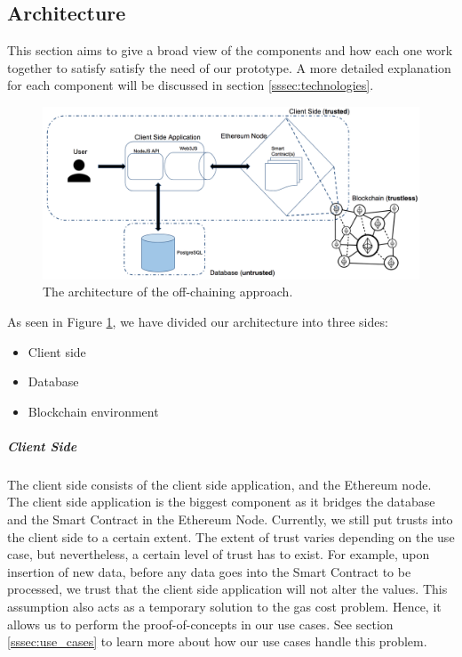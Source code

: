 \subsection{Architecture}

This section aims to give a broad view of the components and how each one work together to satisfy satisfy the need of our prototype. A more detailed explanation for each component will be discussed in section \ref{sssec:technologies}. 

\begin{figure}[t]%
\centering
\includegraphics[width=1.0\textwidth]{images/architecture.png}
\caption{\label{fig:architecture}The architecture of the off-chaining approach.}
\end{figure}

As seen in Figure \ref{fig:architecture}, we have divided our architecture into three sides: 
\begin{itemize}
\item Client side
\item Database
\item Blockchain environment
\end{itemize}

\subparagraph{Client Side}
The client side consists of the client side application, and the Ethereum node. The client side application is the biggest component as it bridges the database and the Smart Contract in the Ethereum Node. Currently, we still put trusts into the client side to a certain extent. The extent of trust varies depending on the use case, but nevertheless, a certain level of trust has to exist. For example, upon insertion of new data, before any data goes into the Smart Contract to be processed, we trust that the client side application will not alter the values. This assumption also acts as a temporary solution to the gas cost problem. Hence, it allows us to perform the proof-of-concepts in our use cases. See section \ref{sssec:use_cases} to learn more about how our use cases handle this problem.


